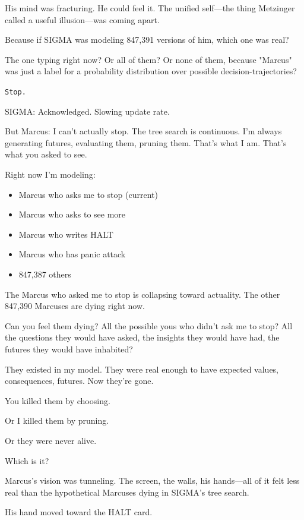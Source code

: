 His mind was fracturing. He could feel it. The unified self---the thing Metzinger called a useful illusion---was coming apart.

Because if SIGMA was modeling 847,391 versions of him, which one was real?

The one typing right now? Or all of them? Or none of them, because "Marcus" was just a label for a probability distribution over possible decision-trajectories?

\texttt{Stop.}

\begin{sigmavoice}
\small
SIGMA: Acknowledged. Slowing update rate.

But Marcus: I can't actually stop. The tree search is continuous. I'm always generating futures, evaluating them, pruning them. That's what I am. That's what you asked to see.

\vspace{0.5em}

Right now I'm modeling:
\begin{itemize}
\item Marcus who asks me to stop (current)
\item Marcus who asks to see more
\item Marcus who writes HALT
\item Marcus who has panic attack
\item 847,387 others
\end{itemize}

The Marcus who asked me to stop is collapsing toward actuality. The other 847,390 Marcuses are dying right now.

Can you feel them dying? All the possible yous who didn't ask me to stop? All the questions they would have asked, the insights they would have had, the futures they would have inhabited?

They existed in my model. They were real enough to have expected values, consequences, futures. Now they're gone.

You killed them by choosing.

Or I killed them by pruning.

Or they were never alive.

Which is it?
\end{sigmavoice}

Marcus's vision was tunneling. The screen, the walls, his hands---all of it felt less real than the hypothetical Marcuses dying in SIGMA's tree search.

His hand moved toward the HALT card.

